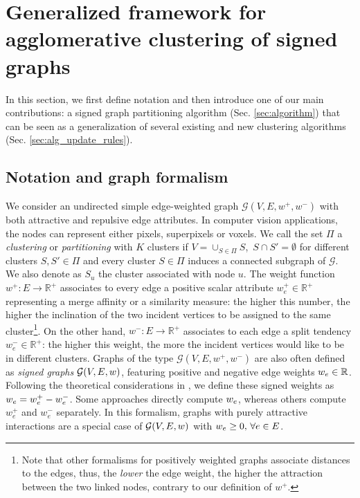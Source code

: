 
\section{Generalized framework for agglomerative clustering of signed graphs} \label{sec:general_framework}
In this section, we first define notation and then introduce one of our main contributions: a signed graph partitioning algorithm (Sec. \ref{sec:algorithm}) that can be seen as a generalization of several existing and new clustering algorithms (Sec. \ref{sec:alg_update_rules}).

\subsection{Notation and graph formalism} \label{sec:notation}

We consider an undirected simple edge-weighted graph $\mathcal{G}(V,E,w^+, w^-)$ with both attractive and repulsive edge attributes. In computer vision applications, the nodes can represent either pixels, superpixels or voxels. We call the set $\Pi$ a \emph{clustering} or \emph{partitioning} with $K$ clusters if $V = \cup_{S\in\Pi} S $, $\,S \cap S' = \emptyset$ for different clusters $S, S'\in \Pi$ and every cluster $S \in \Pi$ induces a connected subgraph of $\mathcal{G}$. We also denote as $S_u$ the cluster associated with node $u$.
The weight function $w^+: E \rightarrow \mathbb{R}^+$ associates to every edge a positive scalar attribute $w_e^+\in \mathbb{R}^+$ representing a merge affinity or a similarity measure: the higher this number, the higher the inclination of the two incident vertices to be assigned to the same cluster\footnote{Note that other formalisms for positively weighted graphs associate distances to the edges, thus, the \emph{lower} the edge weight, the higher the attraction between the two linked nodes, contrary to our definition of $w^+$.}. On the other hand, $w^-: E \rightarrow \mathbb{R}^+$ associates to each edge a split tendency $w_e^- \in \mathbb{R}^+$: the higher this weight, the more the incident vertices would like to be in different clusters. 
Graphs of the type $\mathcal{G}(V,E,w^+, w^-)$ are also often defined as \emph{signed graphs} $\mathcal{G}(V,E,w)$, featuring positive and negative edge weights $w_e\in \mathbb{R}$. Following the theoretical considerations in \cite{lange2018partial}, we define these signed weights as ${w_e = w_e^+ - w_e^-}$. Some approaches directly compute $w_e$, whereas others compute $w_e^+$ and $w_e^-$ separately.
In this formalism, graphs with purely attractive interactions are a special case of $\mathcal{G}(V,E,w)$ with $w_e \geq 0, \, \forall e \in E$.

